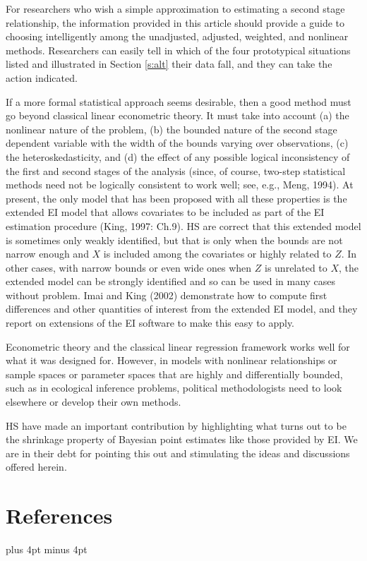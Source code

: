 \documentclass[11pt,titlepage]{article}
\begin{document}
For researchers who wish a simple approximation to estimating a second
stage relationship, the information provided in this article should
provide a guide to choosing intelligently among the unadjusted,
adjusted, weighted, and nonlinear methods.  Researchers can easily tell
in which of the four prototypical situations listed and illustrated in
Section \ref{s:alt} their data fall, and they can take the action
indicated.

If a more formal statistical approach seems desirable, then a good
method must go beyond classical linear econometric theory.  It must
take into account (a) the nonlinear nature of the problem, (b) the
bounded nature of the second stage dependent variable with the width
of the bounds varying over observations, (c) the heteroskedasticity,
and (d) the effect of any possible logical inconsistency of the first
and second stages of the analysis (since, of course, two-step
statistical methods need not be logically consistent to work well;
see, e.g., Meng, 1994).  At present, the only model that has been
proposed with all these properties is the extended EI model that
allows covariates to be included as part of the EI estimation
procedure (King, 1997: Ch.9).  HS are correct that this extended model
is sometimes only weakly identified, but that is only when the bounds
are not narrow enough and $X$ is included among the covariates or
highly related to $Z$.  In other cases, with narrow bounds or even
wide ones when $Z$ is unrelated to $X$, the extended model can be
strongly identified and so can be used in many cases without problem.
Imai and King (2002) demonstrate how to compute first differences and
other quantities of interest from the extended EI model, and they
report on extensions of the EI software to make this easy to apply.

Econometric theory and the classical linear regression framework works
well for what it was designed for.  However, in models with nonlinear
relationships or sample spaces or parameter spaces that are highly and
differentially bounded, such as in ecological inference problems,
political methodologists need to look elsewhere or develop their own
methods.  

HS have made an important contribution by highlighting what turns out
to be the shrinkage property of Bayesian point estimates like those
provided by EI.  We are in their debt for pointing this out and
stimulating the ideas and discussions offered herein.

\section*{References}
\mbox{} \baselineskip=6pt 
\baselineskip plus 4pt minus 4pt
\vspace{-\parskip}
\end{document}
